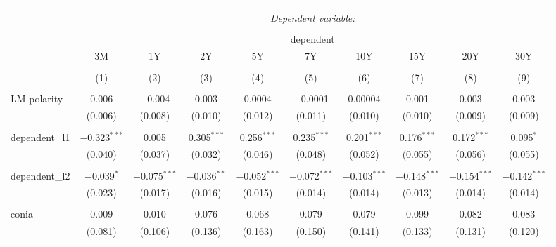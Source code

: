 


\begin{table}[!htbp] \centering 
  \caption{} 
  \label{} 
  \begin{adjustbox}{width=1.35\textwidth}
\begin{tabular}{@{\extracolsep{5pt}}lccccccccc} 
\\[-1.8ex]\hline 
\hline \\[-1.8ex] 
 & \multicolumn{9}{c}{\textit{Dependent variable:}} \\ 
\cline{2-10} 
\\[-1.8ex] & \multicolumn{9}{c}{dependent} \\ 
 & 3M & 1Y & 2Y & 5Y & 7Y & 10Y & 15Y & 20Y & 30Y \\ 
\\[-1.8ex] & (1) & (2) & (3) & (4) & (5) & (6) & (7) & (8) & (9)\\ 
\hline \\[-1.8ex] 
 LM polarity & 0.006 & $-$0.004 & 0.003 & 0.0004 & $-$0.0001 & 0.00004 & 0.001 & 0.003 & 0.003 \\ 
  & (0.006) & (0.008) & (0.010) & (0.012) & (0.011) & (0.010) & (0.010) & (0.009) & (0.009) \\ 
  & & & & & & & & & \\ 
 dependent\_l1 & $-$0.323$^{***}$ & 0.005 & 0.305$^{***}$ & 0.256$^{***}$ & 0.235$^{***}$ & 0.201$^{***}$ & 0.176$^{***}$ & 0.172$^{***}$ & 0.095$^{*}$ \\ 
  & (0.040) & (0.037) & (0.032) & (0.046) & (0.048) & (0.052) & (0.055) & (0.056) & (0.055) \\ 
  & & & & & & & & & \\ 
 dependent\_l2 & $-$0.039$^{*}$ & $-$0.075$^{***}$ & $-$0.036$^{**}$ & $-$0.052$^{***}$ & $-$0.072$^{***}$ & $-$0.103$^{***}$ & $-$0.148$^{***}$ & $-$0.154$^{***}$ & $-$0.142$^{***}$ \\ 
  & (0.023) & (0.017) & (0.016) & (0.015) & (0.014) & (0.014) & (0.013) & (0.014) & (0.014) \\ 
  & & & & & & & & & \\ 
 eonia & 0.009 & 0.010 & 0.076 & 0.068 & 0.079 & 0.079 & 0.099 & 0.082 & 0.083 \\ 
  & (0.081) & (0.106) & (0.136) & (0.163) & (0.150) & (0.141) & (0.133) & (0.131) & (0.120) \\ 

\end{tabular}
\end{adjustbox}
\end{table}

